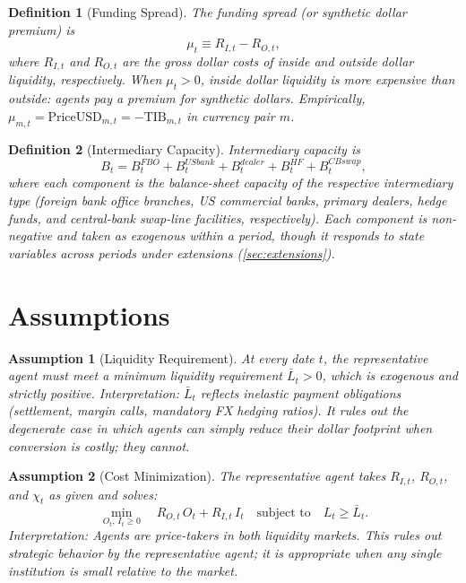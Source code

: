 \documentclass[12pt]{article}
\newtheorem{definition}{Definition}
\newtheorem{assumption}{Assumption}
\theoremstyle{definition}
\newcommand{\1}[1]{\mathds{1}\left[#1\right]}
\begin{document}
\begin{definition}[Funding Spread]
  \label{def:spread}
  The \emph{funding spread} (or \emph{synthetic dollar premium}) is
  \[
    \mu_t \equiv R_{I,t} - R_{O,t},
  \]
  where $R_{I,t}$ and $R_{O,t}$ are the gross dollar costs of inside and outside
  dollar liquidity, respectively. When $\mu_t > 0$, inside dollar liquidity is
  more expensive than outside: agents pay a premium for synthetic dollars.
  Empirically, $\mu_{m,t} = \text{PriceUSD}_{m,t} = -\text{TIB}_{m,t}$ in
  currency pair $m$.
\end{definition}

\begin{definition}[Intermediary Capacity]
  \label{def:capacity}
  \emph{Intermediary capacity} is
  \begin{equation}
    B_t = B_t^{FBO} + B_t^{USbank} + B_t^{dealer} + B_t^{HF} + B_t^{CBswap},
    \label{eq:capacity}
  \end{equation}
  where each component is the balance-sheet capacity of the respective
  intermediary type (foreign bank office branches, US commercial banks, primary
  dealers, hedge funds, and central-bank swap-line facilities, respectively).
  Each component is non-negative and taken as exogenous within a period, though
  it responds to state variables across periods under extensions
  (\cref{sec:extensions}).
\end{definition}

\section{Assumptions}
\label{sec:assumptions}

\begin{assumption}[Liquidity Requirement]
  \label{ass:liq-req}
  At every date $t$, the representative agent must meet a minimum liquidity
  requirement $\bar{L}_t > 0$, which is exogenous and strictly positive.
  \emph{Interpretation:} $\bar{L}_t$ reflects inelastic payment obligations
  (settlement, margin calls, mandatory FX hedging ratios). It rules out the
  degenerate case in which agents can simply reduce their dollar footprint when
  conversion is costly; they cannot.
\end{assumption}

\begin{assumption}[Cost Minimization]
  \label{ass:cost-min}
  The representative agent takes $R_{I,t}$, $R_{O,t}$, and $\chi_t$ as given
  and solves:
  \begin{equation}
    \min_{O_t,\, I_t \geq 0} \quad R_{O,t}\, O_t + R_{I,t}\, I_t
    \quad \text{subject to} \quad L_t \geq \bar{L}_t.
    \label{eq:cost-min}
  \end{equation}
  \emph{Interpretation:} Agents are price-takers in both liquidity markets.
  This rules out strategic behavior by the representative agent; it is
  appropriate when any single institution is small relative to the market.
\end{assumption}
\end{document}

